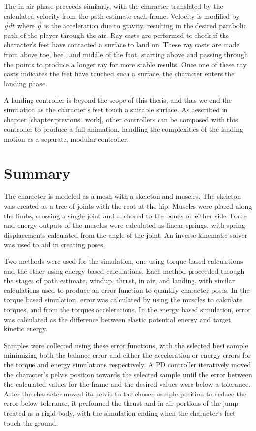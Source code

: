 The in air phase proceeds similarly, with the character translated by the calculated velocity from the path estimate each frame.  Velocity is modified by $\vec{g} dt$ where $\vec{g}$ is the acceleration due to gravity, resulting in the desired parabolic path of the player through the air.  Ray casts are performed to check if the character's feet have contacted a surface to land on.  These ray casts are made from above toe, heel, and middle of the foot, starting above and passing through the points to produce a longer ray for more stable results.  Once one of these ray casts indicates the feet have touched such a surface, the character enters the landing phase.

A landing controller is beyond the scope of this thesis, and thus we end the simulation as the character's feet touch a suitable surface.  As described in chapter \ref{chapter:previous_work}, other controllers can be composed with this controller to produce a full animation, handling the complexities of the landing motion as a separate, modular controller.

\section{Summary}
\label{subsection:animation_summary}
The character is modeled as a mesh with a skeleton and muscles.   The skeleton was created as a tree of joints with the root at the hip.  Muscles were placed along the limbs, crossing a single joint and anchored to the bones on either side.  Force and energy outputs of the muscles were calculated as linear springs, with spring displacements calculated from the angle of the joint.  An inverse kinematic solver was used to aid in creating poses.

Two methods were used for the simulation, one using torque based calculations and the other using energy based calculations.  Each method proceeded through the stages of path estimate, windup, thrust, in air, and landing, with similar calculations used to produce an error function to quantify character poses.  In the torque based simulation, error was calculated by using the muscles to calculate torques, and from the torques accelerations.  In the energy based simulation, error was calculated as the difference between elastic potential energy and target kinetic energy.  

Samples were collected using these error functions, with the selected best sample minimizing both the balance error and either the acceleration or energy errors for the torque and energy simulations respectively.  A PD controller iteratively moved the character's pelvis position towards the selected sample until the error between the calculated values for the frame and the desired values were below a tolerance.  After the character moved its pelvis to the chosen sample position to reduce the error below tolerance, it performed the thrust and in air portions of the jump treated as a rigid body, with the simulation ending when the character's feet touch the ground.